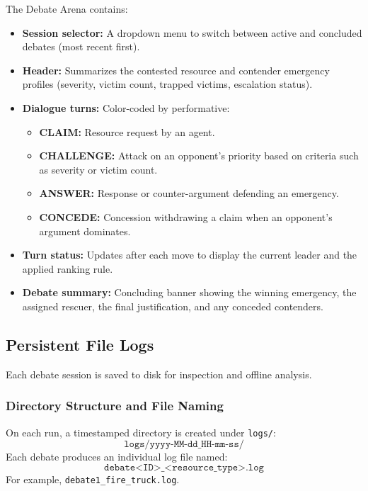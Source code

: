 The Debate Arena contains:
\begin{itemize}
    \item \textbf{Session selector:} A dropdown menu to switch between active and concluded debates (most recent first).
    \item \textbf{Header:} Summarizes the contested resource and contender emergency profiles (severity, victim count, trapped victims, escalation status).
    \item \textbf{Dialogue turns:} Color-coded by performative:
    \begin{itemize}
        \item \textbf{CLAIM:} Resource request by an agent.
        \item \textbf{CHALLENGE:} Attack on an opponent's priority based on criteria such as severity or victim count.
        \item \textbf{ANSWER:} Response or counter-argument defending an emergency.
        \item \textbf{CONCEDE:} Concession withdrawing a claim when an opponent's argument dominates.
    \end{itemize}
    \item \textbf{Turn status:} Updates after each move to display the current leader and the applied ranking rule.
    \item \textbf{Debate summary:} Concluding banner showing the winning emergency, the assigned rescuer, the final justification, and any conceded contenders.
\end{itemize}

\subsection{Persistent File Logs}
\label{subsec:persistent_logs}

Each debate session is saved to disk for inspection and offline analysis.

\subsubsection{Directory Structure and File Naming}
On each run, a timestamped directory is created under \texttt{logs/}:
\[
\texttt{logs/yyyy-MM-dd\_HH-mm-ss/}
\]
Each debate produces an individual log file named:
\[
\texttt{debate<ID>\_<resource\_type>.log}
\]
For example, \texttt{debate1\_fire\_truck.log}.

